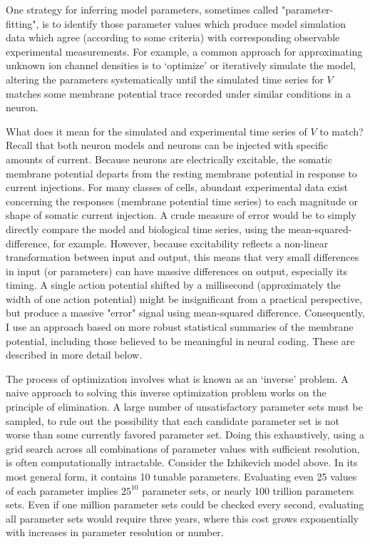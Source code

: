 One strategy for inferring model parameters, sometimes called "parameter-fitting", is to identify those parameter values which produce model simulation data which agree (according to some criteria) with corresponding observable experimental measurements.
For example, a common approach for approximating unknown ion channel densities is to ‘optimize’ or iteratively simulate the model, altering the parameters systematically until the simulated time series for $V$ matches some membrane potential trace recorded under similar conditions in a neuron.

What does it mean for the simulated and experimental time series of $V$ to match?
Recall that both neuron models and neurons can be injected with specific amounts of current. Because neurons are electrically excitable, the somatic membrane potential departs from the resting membrane potential in response to current injections.
For many classes of cells, abundant experimental data exist concerning the responses (membrane potential time series) to each magnitude or shape of somatic current injection.
A crude measure of error would be to simply directly compare the model and biological time series, using the mean-squared-difference, for example.
However, because excitability reflects a non-linear transformation between input and output, this means that very small differences in input (or parameters) can have massive differences on output, especially its timing.
A single action potential shifted by a millisecond (approximately the width of one action potential) might be insignificant from a practical perspective, but produce a massive "error" signal using mean-squared difference.
Consequently, I use an approach based on more robust statistical summaries of the membrane potential, including those believed to be meaningful in neural coding.
These are described in more detail below.

The process of optimization involves what is known as an ‘inverse’ problem.
A naive approach to solving this inverse optimization problem works on the principle of elimination.
A large number of unsatisfactory parameter sets must be sampled, to rule out the possibility that each candidate parameter set is not worse than some currently favored parameter set.
Doing this exhaustively, using a grid search across all combinations of parameter values with sufficient resolution, is often  computationally intractable.
Consider the Izhikevich model above.
In its most general form, it contains 10 tunable parameters.
Evaluating even 25 values of each parameter implies $25^10$ parameter sets, or nearly 100 trillion parameters sets.
Even if one million parameter sets could be checked every second, evaluating all parameter sets would require three years, where this cost grows exponentially with increases in parameter resolution or number.

